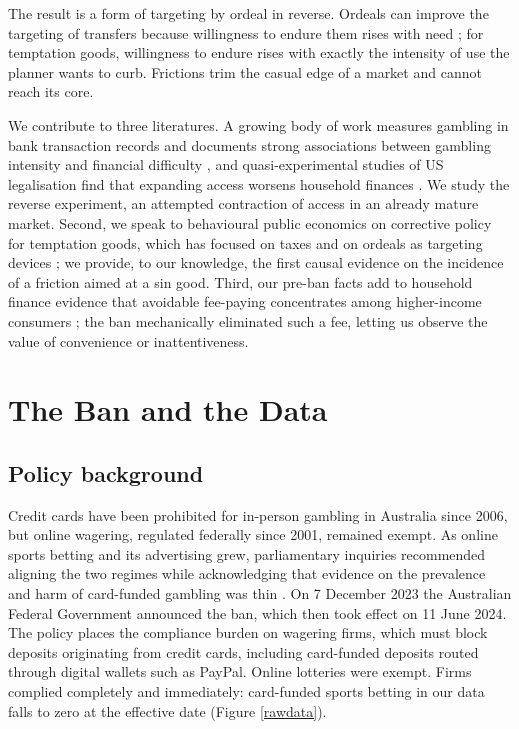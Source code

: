 \documentclass[11pt]{article}
\begin{document}
The result is a form of targeting by ordeal in reverse. Ordeals can improve the targeting of transfers because willingness to endure them rises with need \citep{NicholsZeckhauser1982, AlatasEtAl2016_SelfTargeting}; for temptation goods, willingness to endure rises with exactly the intensity of use the planner wants to curb. Frictions trim the casual edge of a market and cannot reach its core.

We contribute to three literatures. A growing body of work measures gambling in bank transaction records and documents strong associations between gambling intensity and financial difficulty \citep{MuggletonEtAl2021_BigFinancialData, MarionneauEtAl2023_IndebtedBankTransactions, ZendleNewall2024_OpenBankingGambling}, and quasi-experimental studies of US legalisation find that expanding access worsens household finances \citep{HollenbeckEtAl2025_FinancialConsequences, BakerEtAl2024_GamblingAwayStability}. We study the reverse experiment, an attempted contraction of access in an already mature market. Second, we speak to behavioural public economics on corrective policy for temptation goods, which has focused on taxes \citep{AllcottLockwoodTaubinsky2019} and on ordeals as targeting devices \citep{NicholsZeckhauser1982, DeshpandeLi2019_ScreenedOut, Thaler2018_Sludge}; we provide, to our knowledge, the first causal evidence on the incidence of a friction aimed at a sin good. Third, our pre-ban facts add to household finance evidence that avoidable fee-paying concentrates among higher-income consumers \citep{GrahamMcDowall2024_MentalAccounts, NBERw31613, Jorring2023_PaymentChoice}; the ban mechanically eliminated such a fee, letting us observe the value of convenience or inattentiveness.

\section{The Ban and the Data} \label{Setting}

\subsection{Policy background}

Credit cards have been prohibited for in-person gambling in Australia since 2006, but online wagering, regulated federally since 2001, remained exempt. As online sports betting and its advertising grew, parliamentary inquiries recommended aligning the two regimes while acknowledging that evidence on the prevalence and harm of card-funded gambling was thin . On 7 December 2023 the Australian Federal Government announced the ban, which then took effect on 11 June 2024. The policy places the compliance burden on wagering firms, which must block deposits originating from credit cards, including card-funded deposits routed through digital wallets such as PayPal. Online lotteries were exempt. Firms complied completely and immediately: card-funded sports betting in our data falls to zero at the effective date (Figure \ref{rawdata}).
\end{document}
